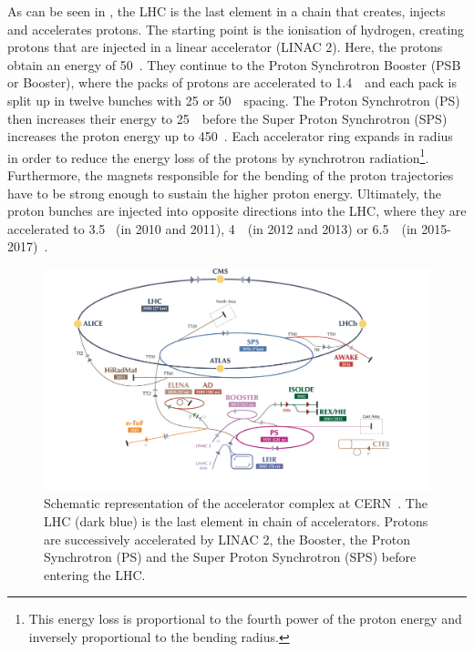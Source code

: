  As can be seen in , the LHC is the last element in a chain that creates, injects and accelerates protons. The starting point is the ionisation of hydrogen, creating protons that are injected in a linear accelerator (LINAC 2). Here, the protons obtain an energy of 50~\MeV. They continue to the Proton Synchrotron Booster (PSB or Booster), where the packs of protons are accelerated to 1.4~\GeV\ and each pack is split up in twelve bunches with 25 or 50~\nano\s\ spacing. The Proton Synchrotron (PS) then increases their energy to 25~\GeV\ before the Super Proton Synchrotron (SPS) increases the proton energy up to 450~\GeV. Each accelerator ring expands in radius in order to reduce the energy loss of the protons by synchrotron radiation\footnote{This energy loss is proportional to the fourth power of the proton energy and inversely proportional to the bending radius.}. Furthermore, the magnets responsible for the bending of the proton trajectories have to be strong enough to sustain the higher proton energy. Ultimately, the proton bunches are injected into opposite directions into the LHC, where they are accelerated to 3.5 \TeV\ (in 2010 and 2011), 4~\TeV\ (in 2012 and 2013) or 6.5~\TeV\ (in 2015-2017)~\cite{Wenninger:2254678}. 
  \begin{figure}[h]
 	\centering
 	\includegraphics[width=1.\textwidth]{2_ExperimentalSetup/Figures/CCC-v2016}
 	\caption{Schematic representation of the accelerator complex at CERN~\cite{DeMelis:2197559}. The LHC (dark blue) is the last element in chain of accelerators. Protons are successively accelerated by LINAC 2, the Booster, the Proton Synchrotron (PS) and the Super Proton Synchrotron (SPS) before entering the LHC.}
 	\label{fig:LHCchain}
 \end{figure}


